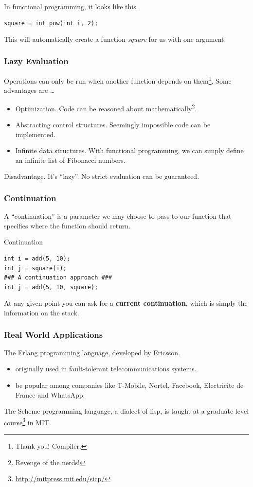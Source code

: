 \documentclass[12pt,hyperref=true,mathserif]{beamer}
\begin{document}
\begin{frame}
In functional programming, it looks like this.
\begin{block}{}
\begin{verbatim}
square = int pow(int i, 2);
\end{verbatim}
\end{block}
This will automatically create a function \emph{square} for us with
one argument.
\end{frame}


\begin{frame}
  \frametitle{Lazy Evaluation}
Operations can only be run when another function depends on
them\footnote{Thank you! Compiler.}. Some advantages are \ldots
\begin{itemize}
  \item Optimization. Code can be reasoned about
    mathematically\footnote{Revenge of the nerds!}. 
  \item Abstracting control structures. Seemingly impossible code can
    be implemented.
  \item Infinite data structures. With functional programming, we can
    simply define an infinite list of Fibonacci numbers. 
\end{itemize}
Disadvantage. It's ``lazy''. No strict evaluation can be guaranteed. 
\end{frame}

\begin{frame}
  \frametitle{Continuation}
A ``continuation'' is a parameter we may choose to pass to our
function that specifies where the function should return.
\begin{block}{Continuation}
\begin{verbatim}
int i = add(5, 10);
int j = square(i);
### A continuation approach ###
int j = add(5, 10, square);
\end{verbatim}
\end{block}
At any given point you can ask for a \textbf{current continuation},
which is simply the information on the stack.
\end{frame}


\begin{frame}
  \frametitle{Real World Applications}
The Erlang programming language, developed by Ericsson.
\begin{itemize}
\item originally used in fault-tolerant telecommunications systems.
\item be popular among companies like  T-Mobile, Nortel, Facebook, Electricite de France and WhatsApp.\\[6pt]
\end{itemize}
The Scheme programming language, a dialect of lisp, is taught at a
graduate level course\footnote{\url{http://mitpress.mit.edu/sicp/}} in MIT.
\end{frame}
\end{document}
